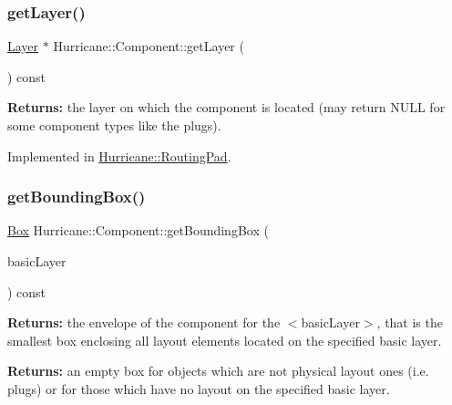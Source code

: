 \mbox{\label{classHurricane_1_1Component_ab451ef19059e6e5bbb77ae391d02a039}} 
\subsubsection{\texorpdfstring{get\+Layer()}{getLayer()}}
{\footnotesize\ttfamily \mbox{\hyperlink{classHurricane_1_1Layer}{Layer}} $\ast$ Hurricane\+::\+Component\+::get\+Layer (\begin{DoxyParamCaption}{ }\end{DoxyParamCaption}) const\hspace{0.3cm}{\ttfamily [pure virtual]}}

{\bfseries Returns\+:} the layer on which the component is located (may return N\+U\+LL for some component types like the plugs). 

Implemented in \mbox{\hyperlink{classHurricane_1_1RoutingPad_a7f1e300e4148556fa223e623738d79d4}{Hurricane\+::\+Routing\+Pad}}.

\mbox{\label{classHurricane_1_1Component_aabb87b9ef71f71cea681a03a6213f616}} 
\subsubsection{\texorpdfstring{get\+Bounding\+Box()}{getBoundingBox()}}
{\footnotesize\ttfamily \mbox{\hyperlink{classHurricane_1_1Box}{Box}} Hurricane\+::\+Component\+::get\+Bounding\+Box (\begin{DoxyParamCaption}\item[{const \mbox{\hyperlink{classHurricane_1_1BasicLayer}{Basic\+Layer}} $\ast$}]{basic\+Layer }\end{DoxyParamCaption}) const\hspace{0.3cm}{\ttfamily [pure virtual]}}

{\bfseries Returns\+:} the envelope of the component for the {\ttfamily $<$basic\+Layer$>$}, that is the smallest box enclosing all layout elements located on the specified basic layer.

{\bfseries Returns\+:} an empty box for objects which are not physical layout ones (i.\+e. plugs) or for those which have no layout on the specified basic layer. \mbox{\label{classHurricane_1_1Component_a4acf996c03b0b94a186fad653ba578a6}} 
